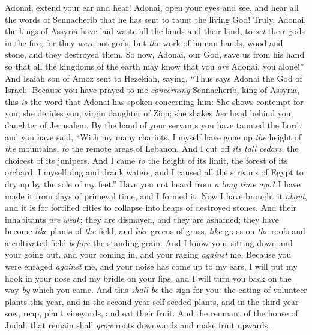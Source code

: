 \begin{biblechapter}
\verse Adonai, extend your ear and hear! Adonai, open your eyes and see, and hear all the words of Sennacherib that he has sent to taunt the living God!
\verse Truly, Adonai, the kings of Assyria have laid waste all the lands and their land,
\verse to \textit{set} their gods in the fire, for they \textit{were} not gods, but \textit{the} work of human hands, wood and stone, and they destroyed them.
\verse So now, Adonai, our God, save us from his hand so that all the kingdoms of the earth may know that you \textit{are} Adonai, you alone!”
 And Isaiah son of Amoz sent to Hezekiah, saying, “Thus says Adonai the God of Israel: ‘Because you have prayed to me \textit{concerning} Sennacherib, king of Assyria,
\verse this \textit{is} the word that Adonai has spoken concerning him:
\verse She shows contempt for you; she derides you, virgin daughter of Zion; 
she shakes \textit{her} head behind you, daughter of Jerusalem.
\verse By the hand of your servants you have taunted the Lord, 
and you have said, “With my many chariots, 
I myself have gone up \textit{the} height of \textit{the} mountains, 
\textit{to} the remote areas of Lebanon. 
And I cut off \textit{its tall cedars}, 
the choicest of its junipers. 
And I came \textit{to} the height of its limit, 
the forest of its orchard.
\verse I myself dug and drank waters, 
and I caused all the streams of Egypt to dry up by the sole of my feet.”
\verse Have you not heard from \textit{a long time ago}? I have made it 
from days of primeval time, and I formed it. 
Now I have brought it \textit{about}, 
and it is for fortified cities to collapse into heaps of destroyed stones.
\verse And their inhabitants \textit{are} \textit{weak}; 
they are dismayed, and they are ashamed; 
they have become \textit{like} plants of \textit{the} field, 
and \textit{like} greens of grass, 
\textit{like} grass on \textit{the} roofs 
and a cultivated field \textit{before} the standing grain.
\verse And I know your sitting down and your going out, 
and your coming in, and your raging \textit{against} me.
\verse Because you were enraged \textit{against} me, 
and your noise has come up to my ears, 
I will put my hook in your nose 
and my bridle on your lips, 
and I will turn you back 
on the way \textit{by} which you came.
\verse And this \textit{shall be} the sign for you: the eating of volunteer plants this year, and in the second year self-seeded plants, and in the third year sow, reap, plant vineyards, and eat their fruit.
\verse And the remnant of the house of Judah that remain shall \textit{grow} roots downwards and make fruit upwards.

\end{biblechapter}
